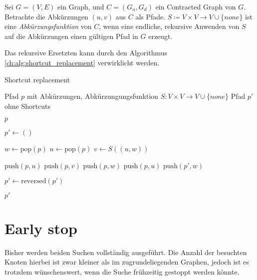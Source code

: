 \begin{definition}[Abkürzungsfunktion]
    Sei $G = (V, E)$ ein Graph, und $C = (G_u, G_d)$ ein Contracted Graph von $G$.
    Betrachte die Abkürzungen $(u, v)$ aus $C$ als Pfade.
    $S \coloneq V \times V \to V \cup \{ {none} \}$ ist eine \emph{Abkürzungsfunktion} von $C$, wenn eine endliche, rekursive Anwenden von $S$ auf die Abkürzungen einen gültigen Pfad in $G$ erzeugt.
\end{definition}

Das rekursive Ersetzten kann durch den Algorithmus \ref{ch:alg:shortcut_replacement} verwirklicht werden.

\begin{algorithm}[ht]
    \caption{Shortcut replacement}
    \begin{algorithmic}[1]
        \Require Pfad $p$ mit Abkürzungen, Abkürzungungsfunktion $S \colon V \times V \to V \cup \{ {none} \}$
        \Ensure Pfad $p'$ ohne Shortcuts

        \State \Return $p$
        \EndIf
        \State

        \State $p' \leftarrow ()$
        \State

        \State $w \leftarrow \text{pop}(p)$
        \State $u \leftarrow \text{pop}(p)$
        \State $v \leftarrow S((u, w))$
        \State

        \State $\text{push}(p, u)$
        \State $\text{push}(p, v)$
        \State $\text{push}(p, w)$
        \Else
        \State $\text{push}(p, u)$
        \State $\text{push}(p', w)$
        \EndIf
        \EndWhile

        \State
        \State $p' \leftarrow \text{reversed}(p')$

        \State
        \State \Return $p'$
    \end{algorithmic}
    \label{ch:alg:shortcut_replacement}
\end{algorithm}

\section{Early stop}

Bisher werden beiden Suchen vollständig ausgeführt.
Die Anzahl der besuchten Knoten hierbei ist zwar kleiner als im zugrundeliegenden Graphen, jedoch ist es trotzdem wünschenswert, wenn die Suche frühzeitig gestoppt werden könnte.

